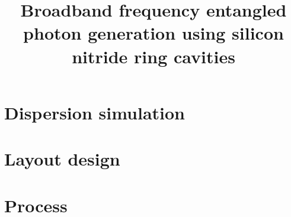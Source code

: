 \documentclass[final]{kuee_en}
\title{Broadband frequency entangled photon generation using silicon nitride ring cavities}
\author{\cjk{殷　政浩}}
\date{\cjk{令和2年2月1日}}
\begin{document}
\maketitle

\begin{abstract}
    \lipsum[1]
\end{abstract}

\tableofcontents












\begin{acknowledgements}
\lipsum[2-4]
\end{acknowledgements}

% 
% 
% 
\printbibliography[title=References,heading=bibintoc]

\clearpage %
\processdelayedfloats
\clearpage

\begin{appendices}
\chapter{Dispersion simulation}
\chapter{Layout design}
\chapter{Process}

\end{appendices}
\end{document}
